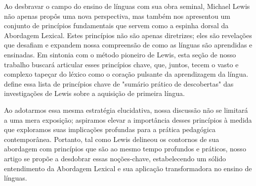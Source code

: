 Ao desbravar o campo do ensino de línguas com sua obra seminal, Michael Lewis não apenas propôs uma nova perspectiva, mas também nos apresentou um conjunto de princípios fundamentais que servem como a espinha dorsal da Abordagem Lexical. Estes princípios não são apenas diretrizes; eles são revelações que desafiam e expandem nossa compreensão de como as línguas são aprendidas e ensinadas. Em sintonia com o método pioneiro de Lewis, esta seção de nosso trabalho buscará articular esses princípios chave, que, juntos, tecem o vasto e complexo tapeçar do léxico como o coração pulsante da aprendizagem da língua.  define essa lista de princípios chave de "sumário prático de descobertas" das investigações de Lewis sobre a aquisição de primeira língua.

Ao adotarmos essa mesma estratégia elucidativa, nossa discussão não se limitará a uma mera exposição; aspiramos elevar a importância desses princípios à medida que exploramos suas implicações profundas para a prática pedagógica contemporânea. Portanto, tal como Lewis delineou os contornos de sua abordagem com princípios que são ao mesmo tempo profundos e práticos, nosso artigo se propõe a desdobrar essas noções-chave, estabelecendo um sólido entendimento da Abordagem Lexical e sua aplicação transformadora no ensino de línguas.

\section{}
\section{}

